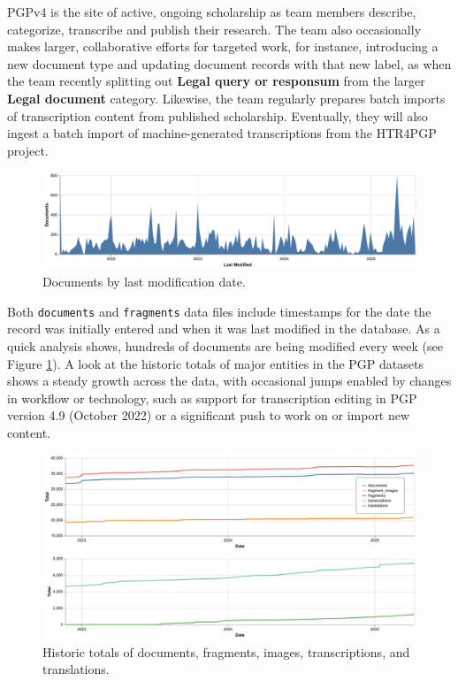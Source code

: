\documentclass{article}
\begin{document}
PGPv4 is the site of active, ongoing scholarship as team members describe, categorize, transcribe and publish  their research. The team also occasionally makes larger, collaborative efforts for targeted work, for instance, introducing a new document type and updating document records with that new label, as when the team recently splitting out \textbf{Legal query or responsum} from the larger \textbf{Legal document} category. Likewise, the team regularly prepares batch imports of transcription content from published scholarship. Eventually, they will also ingest a batch import of machine-generated transcriptions from the HTR4PGP project.

\begin{figure}[!hbt]
  \includegraphics[width=\textwidth]{charts/docs_last_modified.pdf}
  \centering
  \caption{Documents by last modification date.}
  \label{fig:docs-last-modified}
\end{figure}

Both \texttt{documents} and \texttt{fragments} data files include timestamps for the date the record was initially entered and when it was last modified in the database. As a quick analysis shows, hundreds of documents are being modified every week (see Figure \ref{fig:docs-last-modified}). A look at the historic totals of major entities in the PGP datasets shows a steady growth across the data, with occasional jumps enabled by changes in workflow or technology, such as support for transcription editing in PGP version 4.9 (October 2022) or a significant push to work on or import new content.

\begin{figure}[!hbt]
  \includegraphics[width=\textwidth]{charts/combined_totals_historic.pdf}
  \centering
  \caption{Historic totals of documents, fragments, images, transcriptions, and translations.}
  \label{fig:historic-totals}
\end{figure}
\end{document}
